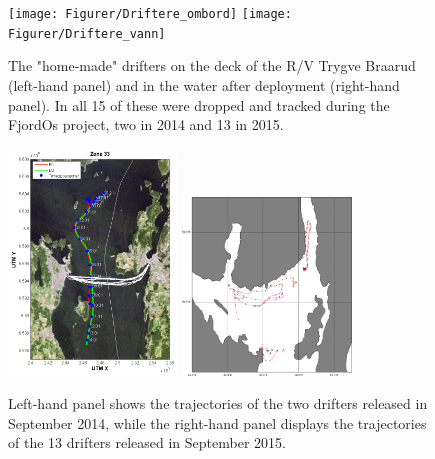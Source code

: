 \begin{figure}[ht]
	\centerline{
		\texttt{[image: Figurer/Driftere\_ombord]}
		\texttt{[image: Figurer/Driftere\_vann]}
		}
	\caption{\small The "home-made" drifters on the deck of the R/V Trygve Braarud (left-hand panel) and in the water after deployment (right-hand panel). In all 15 of these were dropped and tracked during the FjordOs project, two in 2014 and 13 in 2015.}
	\label{fig:drifters_design}
\end{figure}

\begin{figure}[ht]
	\centerline{
		\includegraphics*[width=0.4\textwidth]{Figurer/drifters_sept2014}
		\includegraphics*[width=0.4\textwidth]{Figurer/drifters_low_crop}
		}
	\caption{\small Left-hand panel shows the trajectories of the two drifters released in September 2014, while the right-hand panel displays the trajectories of the 13 drifters released in September 2015.}
	\label{fig:drifters_tracks}
\end{figure}

